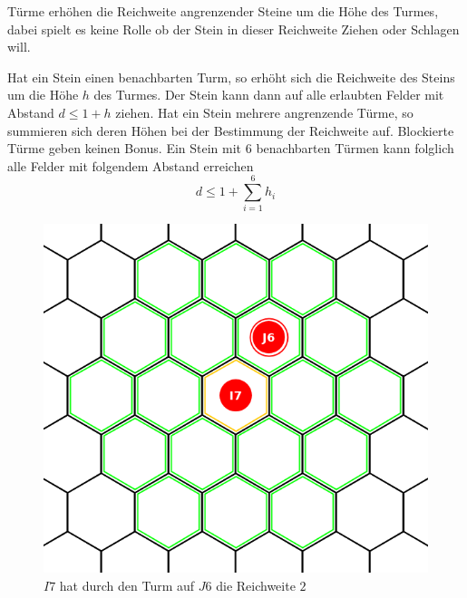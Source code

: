 Türme erhöhen die Reichweite angrenzender Steine um die Höhe des Turmes, dabei spielt es keine Rolle ob der Stein in dieser Reichweite Ziehen oder Schlagen will.

Hat ein Stein einen benachbarten Turm, so erhöht sich die Reichweite des Steins um die Höhe $h$ des Turmes. Der Stein kann dann auf alle erlaubten Felder mit Abstand $d \le 1 + h$ ziehen. Hat ein Stein mehrere angrenzende Türme, so summieren sich deren Höhen bei der Bestimmung der Reichweite auf. Blockierte Türme geben keinen Bonus. Ein Stein mit $6$ benachbarten Türmen kann folglich alle Felder mit folgendem Abstand erreichen \[d \le 1 + \sum_{i=1}^6 h_i\]

\begin{figure}[ht]
\begin{center}
\includegraphics[scale=0.25]{graphic/move-ranged.png}
\end{center}
\caption*{$I7$ hat durch den Turm auf $J6$ die Reichweite $2$}
\end{figure}

